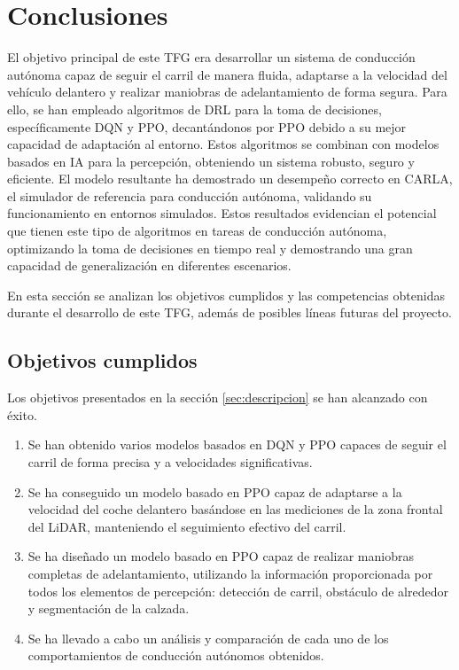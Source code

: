 \chapter{Conclusiones}
\label{cap:capitulo5}

El objetivo principal de este \ac{TFG} era desarrollar un sistema de conducción autónoma capaz de seguir el carril de manera fluida, adaptarse a la velocidad del vehículo delantero y realizar maniobras de adelantamiento de forma segura. Para ello, se han empleado algoritmos de \ac{DRL} para la toma de decisiones, específicamente \ac{DQN} y \ac{PPO}, decantándonos por PPO debido a su mejor capacidad de adaptación al entorno. Estos algoritmos se combinan con modelos basados en \ac{IA} para la percepción, obteniendo un sistema robusto, seguro y eficiente. El modelo resultante ha demostrado un desempeño correcto en CARLA, el simulador de referencia para conducción autónoma, validando su funcionamiento en entornos simulados. Estos resultados evidencian el potencial que tienen este tipo de algoritmos en tareas de conducción autónoma, optimizando la toma de decisiones en tiempo real y demostrando una gran capacidad de generalización en diferentes escenarios.

En esta sección se analizan los objetivos cumplidos y las competencias obtenidas durante el desarrollo de este \ac{TFG}, además de posibles líneas futuras del proyecto.
\section{Objetivos cumplidos}

Los objetivos presentados en la sección \ref{sec:descripcion} se han alcanzado con éxito.

\begin{enumerate}
\item Se han obtenido varios modelos basados en \ac{DQN} y \ac{PPO} capaces de seguir el carril de forma precisa y a velocidades significativas. 
\item Se ha conseguido un modelo basado en \ac{PPO} capaz de adaptarse a la velocidad del coche delantero basándose en las mediciones de la zona frontal del \ac{LiDAR}, manteniendo el seguimiento efectivo del carril.
\item Se ha diseñado un modelo basado en \ac{PPO} capaz de realizar maniobras completas de adelantamiento, utilizando la información proporcionada por todos los elementos de percepción: detección de carril, obstáculo de alrededor y segmentación de la calzada.
\item Se ha llevado a cabo un análisis y comparación de cada uno de los comportamientos de conducción autónomos obtenidos.
\end{enumerate}

